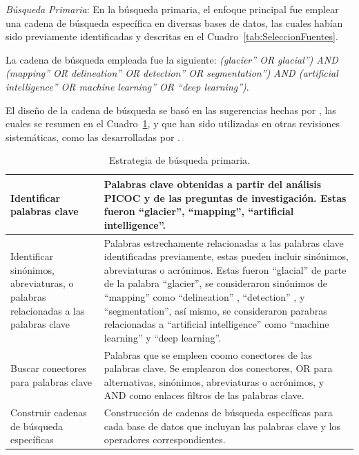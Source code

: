 \textit{Búsqueda Primaria}: En la búsqueda primaria, el enfoque principal fue emplear una cadena de búsqueda específica en diversas bases de datos, las cuales habían sido previamente identificadas y descritas en el Cuadro~\ref{tab:SeleccionFuentes}.

La cadena de búsqueda empleada fue la siguiente: \textit{(glacier'' OR glacial'') AND (mapping'' OR delineation'' OR detection'' OR segmentation'') AND (artificial intelligence'' OR machine learning'' OR ``deep learning'')}.

El diseño de la cadena de búsqueda se basó en las sugerencias hechas por \cite{buckley2005towards}, las cuales se resumen en el Cuadro~\ref{tab:EstrategiaBusquedaPrimaria}, y que han sido utilizadas en otras revisiones sistemáticas, como las desarrolladas por .

\begin{table}[H] 
\small
\caption{Estrategia de búsqueda primaria.\label{tab:EstrategiaBusquedaPrimaria}}
\begin{tabularx}{\textwidth}{p{4.25cm}X}
\hline
Identificar palabras clave & Palabras clave obtenidas a partir del análisis PICOC y de las preguntas de investigación. Estas fueron  ``glacier'', ``mapping'', ``artificial intelligence''.\\\hline
Identificar sinónimos, abreviaturas, o palabras relacionadas a las palabras clave &
Palabras estrechamente relacionadas a las palabras clave identificadas previamente, estas pueden incluir sinónimos, abreviaturas o acrónimos. Estas fueron  ``glacial'' de parte de la palabra ``glacier'', se consideraron sinónimos de ``mapping'' como ``delineation'' , ``detection'' , y ``segmentation'', así mismo, se consideraron parabras relacionadas a ``artificial intelligence'' como ``machine learning'' y ``deep learning''.\\\hline
Buscar conectores para palabras clave & Palabras que se empleen coomo conectores de las palabras clave. Se emplearon dos conectores, OR para alternativas, sinónimos, abreviaturas o acrónimos, y AND como enlaces filtros de las palabras clave. \\\hline
Construir cadenas de búsqueda específicas & Construcción de cadenas de búsqueda específicas para cada base de datos que incluyan las palabras clave y los operadores correspondientes.\\
\hline
\end{tabularx}
\end{table}

